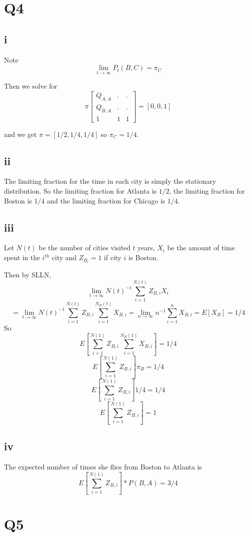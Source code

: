 \documentclass{article}
\begin{document}
\section*{Q4}
\subsection*{i}
Note
$$
\lim_{t \to \infty} P_t(B,C) = \pi_C
$$

Then we solve for
$$
\pi \begin{bmatrix}
Q_{A,A} & . & . \\
Q_{B,A} & . & . \\
1 & 1 & 1
\end{bmatrix}
= [0, 0, 1]
$$


and we get $\pi = [ 1/2,1/4, 1/4]$
so $\pi_C = 1/4$.

\subsection*{ii}
The limiting fraction for the time in each city is simply the stationary distribution.
So
the limiting fraction for Atlanta is $1/2$, the limiting fraction for Boston is $1/4$ and the limiting fraction for Chicago is $1/4$.

\subsection*{iii}
Let $N(t)$ be the number of cities visited $t$ years, $X_{i}$ be the amount of time spent in the $i^{th}$ city and $Z_{B_i} = 1$ if city $i$ is Boston.

Then by SLLN,
$$
\lim_{t \to \infty} N(t)^{-1} \sum_{i =1}^{N(t)} Z_{B,i}X_{i} 
$$
$$
=\lim_{t \to \infty} N(t)^{-1} \sum_{i=1}^{N(t)} Z_{B,i}\sum_{i =1}^{N_B(t)} X_{B,i} = \lim_{n \to \infty} n^{-1} \sum_{i =1}^{n} X_{B,i} = E[X_B] = 1/4
$$
So
$$
E[\sum_{i=1}^{N(1)} Z_{B,i}\sum_{i =1}^{N_B(1)} X_{B,i}] = 1/4
$$
$$
E[\sum_{i=1}^{N(1)} Z_{B,i}] \pi_B = 1/4
$$
$$
E[\sum_{i=1}^{N(1)} Z_{B,i}] 1/4 = 1/4
$$
$$
E[\sum_{i=1}^{N(1)} Z_{B,i}] = 1
$$

\subsection*{iv}
The expected number of times she flies from Boston to Atlanta is
$$
E[\sum_{i=1}^{N(1)} Z_{B,i}] * P(B,A) = 3/4
$$

\section*{Q5}
\end{document}
